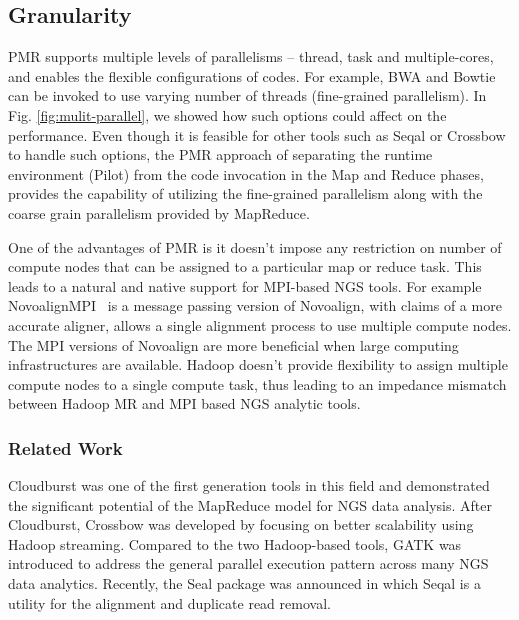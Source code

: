 \documentclass{acm_proc_article-sp}
\begin{document}
\subsection{Granularity} 
PMR supports multiple levels of parallelisms -- thread, task and
multiple-cores, and enables the flexible configurations of codes. For
example, BWA and Bowtie can be invoked to use varying number of
threads (fine-grained parallelism).  In Fig. \ref{fig:mulit-parallel},
we showed how such options could affect on the performance.  Even
though it is feasible for other tools such as Seqal or Crossbow to
handle such options, the PMR approach of separating the runtime
environment (Pilot) from the code invocation in the Map and Reduce
phases, provides the capability of utilizing the fine-grained
parallelism along with the coarse grain parallelism provided by
MapReduce. %

One of the advantages of PMR is it doesn't impose any restriction on
number of compute nodes that can be assigned to a particular map or
reduce task. This leads to a natural and native support for MPI-based
NGS tools. For example NovoalignMPI~\cite{novo-align} is a message
passing version of Novoalign, with claims of a more accurate aligner,
allows a single alignment process to use multiple compute nodes. The
MPI versions of Novoalign are more beneficial when large computing
infrastructures are available. Hadoop doesn't provide flexibility to
assign multiple compute nodes to a single compute task, thus leading
to an impedance mismatch between Hadoop MR and MPI based NGS analytic
tools.


\subsubsection*{Related Work}

Cloudburst was one of the first generation tools in this field and
demonstrated the significant potential of the MapReduce model for NGS
data analysis.  After Cloudburst, Crossbow was developed by focusing
on better scalability using Hadoop streaming.  Compared to the two
Hadoop-based tools, GATK was introduced to address the general
parallel execution pattern across many NGS data analytics.  Recently,
the Seal package was announced in which Seqal is a utility for the
alignment and duplicate read removal.
\end{document}
